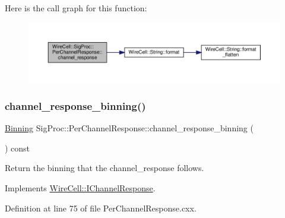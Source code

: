 Here is the call graph for this function\+:
\nopagebreak
\begin{figure}[H]
\begin{center}
\leavevmode
\includegraphics[width=350pt]{class_wire_cell_1_1_sig_proc_1_1_per_channel_response_a9112d33075a8ac432b5e32bed5c65f5b_cgraph}
\end{center}
\end{figure}
\mbox{\label{class_wire_cell_1_1_sig_proc_1_1_per_channel_response_ab5b6e69f75c2847269b1a0c6c4992709}} 
\subsubsection{\texorpdfstring{channel\+\_\+response\+\_\+binning()}{channel\_response\_binning()}}
{\footnotesize\ttfamily \hyperlink{class_wire_cell_1_1_binning}{Binning} Sig\+Proc\+::\+Per\+Channel\+Response\+::channel\+\_\+response\+\_\+binning (\begin{DoxyParamCaption}{ }\end{DoxyParamCaption}) const\hspace{0.3cm}{\ttfamily [virtual]}}



Return the binning that the channel\+\_\+response follows. 



Implements \hyperlink{class_wire_cell_1_1_i_channel_response_a6a3daf077f98883b5d4f9dd6529e99fe}{Wire\+Cell\+::\+I\+Channel\+Response}.



Definition at line 75 of file Per\+Channel\+Response.\+cxx.

\mbox{\label{class_wire_cell_1_1_sig_proc_1_1_per_channel_response_aeab6cfaae5ca5e6697a025d957083047}} 
